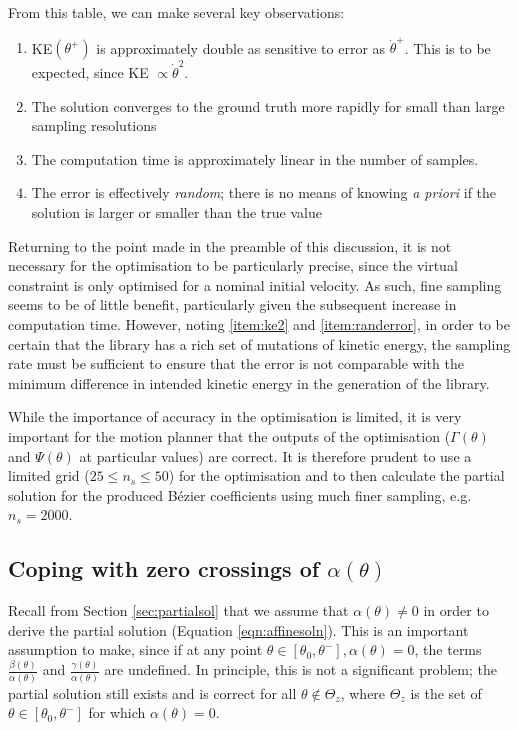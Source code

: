 From this table, we can make several key observations:
\begin{adjustwidth}{0.5cm}{}
\begin{enumerate}[label=\bfseries Obs \arabic*, parsep=0pt]
	\item KE$(\theta^+)$ is approximately double as sensitive to error as $\dot{\theta}^+$. This is to be expected, since KE $\propto \dot{\theta}^2$. \label{item:ke2}
	\item The solution converges to the ground truth more rapidly for small than large sampling resolutions
	\item The computation time is approximately linear in the number of samples.
	\item The error is effectively \textit{random}; there is no means of knowing \textit{a priori} if the solution is larger or smaller than the true value \label{item:randerror}
\end{enumerate}
\end{adjustwidth}

Returning to the point made in the preamble of this discussion, it is not necessary for the optimisation to be particularly precise, since the virtual constraint is only optimised for a nominal initial velocity. As such, fine sampling seems to be of little benefit, particularly given the subsequent increase in computation time. However, noting \ref{item:ke2} and \ref{item:randerror}, in order to be certain that the library has a rich set of mutations of kinetic energy, the sampling rate must be sufficient to ensure that the error is not comparable with the minimum difference in intended kinetic energy in the generation of the library.

While the importance of accuracy in the optimisation is limited, it is very important for the motion planner that the outputs of the optimisation ($\Gamma(\theta)$ and $\Psi(\theta)$ at particular values) are correct. It is therefore prudent to use a limited grid ($25 \leq n_s \leq 50$) for the optimisation and to then calculate the partial solution for the produced Bézier coefficients using much finer sampling, e.g. $n_s = 2000$. 

\subsection{Coping with zero crossings of $\alpha(\theta)$} \label{sec:alphazerocrossing}
Recall from Section \ref{sec:partialsol} that we assume that $\alpha(\theta)\neq 0$ in order to derive the partial solution (Equation \ref{eqn:affinesoln}). This is an important assumption to make, since if at any point $\theta \in [\theta_0, \theta^-], \alpha(\theta) = 0$, the terms $\frac{\beta(\theta)}{\alpha(\theta)}$ and $\frac{\gamma(\theta)}{\alpha(\theta)}$ are undefined. In principle, this is not a significant problem; the partial solution still exists and is correct for all $\theta \not \in \Theta_z$, where $\Theta_z$ is the set of $\theta \in [\theta_0, \theta^-]$ for which $\alpha(\theta)=0$.

